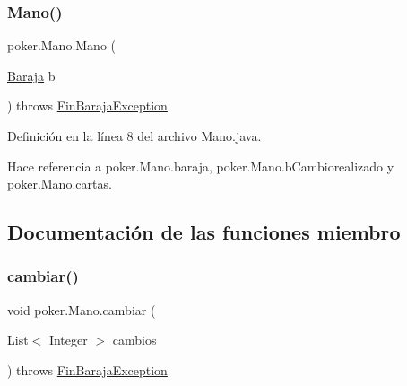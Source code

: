 \subsubsection{\texorpdfstring{Mano()}{Mano()}}
{\footnotesize\ttfamily poker.\+Mano.\+Mano (\begin{DoxyParamCaption}\item[{\mbox{\hyperlink{classpoker_1_1Baraja}{Baraja}}}]{b }\end{DoxyParamCaption}) throws \mbox{\hyperlink{classpoker_1_1FinBarajaException}{Fin\+Baraja\+Exception}}}



Definición en la línea 8 del archivo Mano.\+java.


\begin{DoxyCode}{0}

\end{DoxyCode}


Hace referencia a poker.\+Mano.\+baraja, poker.\+Mano.\+b\+Cambiorealizado y poker.\+Mano.\+cartas.



\subsection{Documentación de las funciones miembro}
\mbox{\label{classpoker_1_1Mano_a1f3e7289b85d98324d46a8afce171368}} 
\subsubsection{\texorpdfstring{cambiar()}{cambiar()}}
{\footnotesize\ttfamily void poker.\+Mano.\+cambiar (\begin{DoxyParamCaption}\item[{List$<$ Integer $>$}]{cambios }\end{DoxyParamCaption}) throws \mbox{\hyperlink{classpoker_1_1FinBarajaException}{Fin\+Baraja\+Exception}}}



